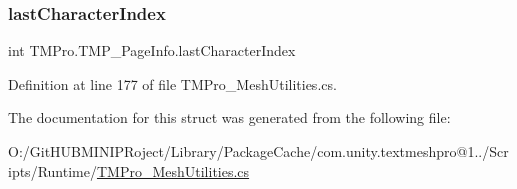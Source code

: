 \subsubsection{\texorpdfstring{lastCharacterIndex}{lastCharacterIndex}}
{\footnotesize\ttfamily int T\+M\+Pro.\+T\+M\+P\+\_\+\+Page\+Info.\+last\+Character\+Index}



Definition at line 177 of file T\+M\+Pro\+\_\+\+Mesh\+Utilities.\+cs.



The documentation for this struct was generated from the following file\+:\begin{DoxyCompactItemize}
\item 
O\+:/\+Git\+H\+U\+B\+M\+I\+N\+I\+P\+Roject/\+Library/\+Package\+Cache/com.\+unity.\+textmeshpro@1../\+Scripts/\+Runtime/\mbox{\hyperlink{_t_m_pro___mesh_utilities_8cs}{T\+M\+Pro\+\_\+\+Mesh\+Utilities.\+cs}}\end{DoxyCompactItemize}
